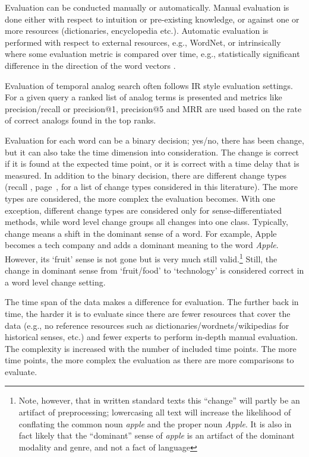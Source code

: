 \documentclass[output=paper]{langsci/langscibook}
\begin{document}
 Evaluation can be conducted manually or automatically. Manual evaluation is done either with respect to intuition or pre-existing knowledge, or against one or more resources (dictionaries, encyclopedia etc.). Automatic evaluation is performed with respect to external resources, e.g., WordNet, or intrinsically where some evaluation metric is compared over time, e.g., statistically significant difference in the direction of the word vectors \citep{kulkarni2015statistically}. 

Evaluation of temporal analog search often follows IR style evaluation settings. For a given query a ranked list of analog terms is presented and metrics like precision/recall \citep{tahmasebi2012neer} or precision@1, precision@5 and MRR \citep{zhang2016past} are used based on the rate of correct analogs found in the top ranks.
	
	Evaluation for each word can be a binary decision; yes/no, there has been change, but it can also take the time dimension into consideration. The change is correct if it is found at the expected time point, or it is correct with a time delay that is measured. In addition to the binary decision, there are different change types (recall , page~\pageref{tab:changetypes}, for a list of change types considered in this literature). The more types are considered, the more complex the evaluation becomes. With one exception, different change types are considered only for sense-differentiated methods, while word level change groups all changes into one class. Typically, change means a shift in the dominant sense of a word. For example, Apple becomes a tech company and adds a dominant meaning to the word \emph{Apple}. However, its `fruit' sense is not gone but is very much still valid.\footnote{Note, however, that in written standard texts this ``change'' will partly be an artifact of preprocessing; lowercasing all text will increase the likelihood of conflating the common noun \emph{apple} and the proper noun \emph{Apple}. It is also in fact likely that the ``dominant'' sense of \emph{apple} is an artifact of the dominant modality and genre, and not a fact of language} Still, the change in dominant sense from `fruit/food' to `technology' is considered correct in a word level change setting. 
    

	The time span of the data makes a difference for evaluation. The further back in time, the harder it is to evaluate since there are fewer resources that cover the data (e.g., no reference resources such as dictionaries/wordnets/wikipedias for historical senses, etc.) and fewer experts to perform in-depth manual evaluation. The complexity is increased with the number of included time points. The more time points, the more complex the evaluation as there are more comparisons to evaluate. 
	
\end{document}
